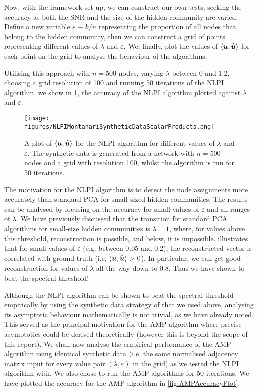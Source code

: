 Now, with the framework set up, we can construct our own tests, seeking the accuracy as both the SNR and the size of the hidden community are varied.
Define a new variable $\varepsilon \equiv k/n$ representing the proportion of all nodes that belong to the hidden community, then we can construct a grid of points representing different values of $\lambda$ and $\varepsilon$.
We, finally, plot the values of $\innerP{\vecvar{u},\widehat{\vecvar{u}}}$ for each point on the grid to analyse the behaviour of the algorithms.

Utilising this approach with $n=500$ nodes, varying $\lambda$ between 0 and 1.2, choosing a grid resolution of 100 and running 50 iterations of the NLPI algorithm, we show in \cref{fig:NLPIAccuracyPlot}, the accuracy of the NLPI algorithm plotted against $\lambda$ and $\varepsilon$.

\begin{figure}
	\centering
	\texttt{[image: figures/NLPIMontanariSyntheticDataScalarProducts.png]}
	\caption[Plot of accuracy for NLPI algorithm.]{\label{fig:NLPIAccuracyPlot} A plot of $\innerP{\vecvar{u},\widehat{\vecvar{u}}}$ for the NLPI algorithm for different values of $\lambda$ and $\varepsilon$. The synthetic data is generated from a network with $n=500$ nodes and a grid with resolution 100, whilst the algorithm is run for 50 iterations.}
\end{figure}

The motivation for the NLPI algorithm is to detect the node assignments more accurately than standard PCA for small-sized hidden communities. The results can be analysed by focusing on the accuracy for small values of $\varepsilon$ and all ranges of $\lambda$.
We have previously discussed that the transition for standard PCA algorithms for small-size hidden communities is $\lambda = 1$, where, for values above this threshold, reconstruction is possible, and below, it is impossible.
 illustrates that for small values of $\varepsilon$ (e.g. between 0.05 and 0.2), the reconstructed vector is correlated with ground-truth (i.e. $\innerP{\vecvar{u},\widehat{\vecvar{u}}} > 0$).
In particular, we can get good reconstruction for values of $\lambda$ all the way down to 0.8. Thus we have shown to beat the spectral threshold!

Although the NLPI algorithm can be shown to beat the spectral threshold empirically by using the synthetic data strategy of \cite{Mon13}  that we used above, analysing its asymptotic behaviour mathematically is not trivial, as we have already noted.
This served as the principal motivation for the AMP algorithm where precise asymptotics could be derived theoretically (however this is beyond the scope of this report).
We shall now analyse the empirical performance of the AMP algorithm using identical synthetic data (i.e. the same normalised adjacency matrix input for every value pair $(\lambda,\varepsilon)$ in the grid) as we tested the NLPI algorithm with. We also chose to run the AMP algorithms for 50 iterations.
We have plotted the accuracy for the AMP algorithm in \cref{fig:AMPAccuracyPlot}.

